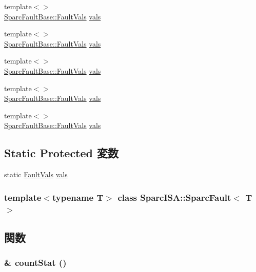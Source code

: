 \begin{DoxyCompactItemize}
\item 
{\footnotesize template$<$$>$ }\\\hyperlink{structSparcISA_1_1SparcFaultBase_1_1FaultVals}{SparcFaultBase::FaultVals} \hyperlink{classSparcISA_1_1SparcFault_a88174a6ce260cacb323e0d78465e4c52}{vals}
\item 
{\footnotesize template$<$$>$ }\\\hyperlink{structSparcISA_1_1SparcFaultBase_1_1FaultVals}{SparcFaultBase::FaultVals} \hyperlink{classSparcISA_1_1SparcFault_a88174a6ce260cacb323e0d78465e4c52}{vals}
\item 
{\footnotesize template$<$$>$ }\\\hyperlink{structSparcISA_1_1SparcFaultBase_1_1FaultVals}{SparcFaultBase::FaultVals} \hyperlink{classSparcISA_1_1SparcFault_a88174a6ce260cacb323e0d78465e4c52}{vals}
\item 
{\footnotesize template$<$$>$ }\\\hyperlink{structSparcISA_1_1SparcFaultBase_1_1FaultVals}{SparcFaultBase::FaultVals} \hyperlink{classSparcISA_1_1SparcFault_a88174a6ce260cacb323e0d78465e4c52}{vals}
\item 
{\footnotesize template$<$$>$ }\\\hyperlink{structSparcISA_1_1SparcFaultBase_1_1FaultVals}{SparcFaultBase::FaultVals} \hyperlink{classSparcISA_1_1SparcFault_a88174a6ce260cacb323e0d78465e4c52}{vals}
\end{DoxyCompactItemize}
\subsection*{Static Protected 変数}
\begin{DoxyCompactItemize}
\item 
static \hyperlink{structSparcISA_1_1SparcFaultBase_1_1FaultVals}{FaultVals} \hyperlink{classSparcISA_1_1SparcFault_a8b3c2006cfd550d551232a82b397bbca}{vals}
\end{DoxyCompactItemize}
\subsubsection*{template$<$typename T$>$ class SparcISA::SparcFault$<$ T $>$}



\subsection{関数}
\hypertarget{classSparcISA_1_1SparcFault_a6c79663c761ff57265459f7e3aefaf4c}{
\subsubsection[{countStat}]{\& countStat ()}}
\label{classSparcISA_1_1SparcFault_a6c79663c761ff57265459f7e3aefaf4c}


